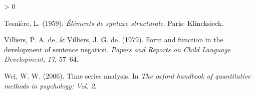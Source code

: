 \documentclass[
  english,
  man,floatsintext]{apa6}
\newlength{\cslhangindent}
\newenvironment{CSLReferences}[2] %
 {%
  \setlength{\parindent}{0pt}
  \ifodd #1 \everypar{\setlength{\hangindent}{\cslhangindent}}\ignorespaces\fi
  \ifnum #2 > 0
  \setlength{\parskip}{#2\baselineskip}
  \fi
 }%
 {}
\begin{document}
\begin{CSLReferences}{1}{0}
\leavevmode\hypertarget{ref-dg}{}%
Tesnière, L. (1959). \emph{Éléments de syntaxe structurale}. Paris: Klincksieck.

\leavevmode\hypertarget{ref-de1979form}{}%
Villiers, P. A. de, \& Villiers, J. G. de. (1979). Form and function in the development of sentence negation. \emph{Papers and Reports on Child Language Development}, \emph{17}, 57--64.

\leavevmode\hypertarget{ref-wei2006time}{}%
Wei, W. W. (2006). Time series analysis. In \emph{The oxford handbook of quantitative methods in psychology: Vol. 2}.

\end{CSLReferences}
\end{document}
